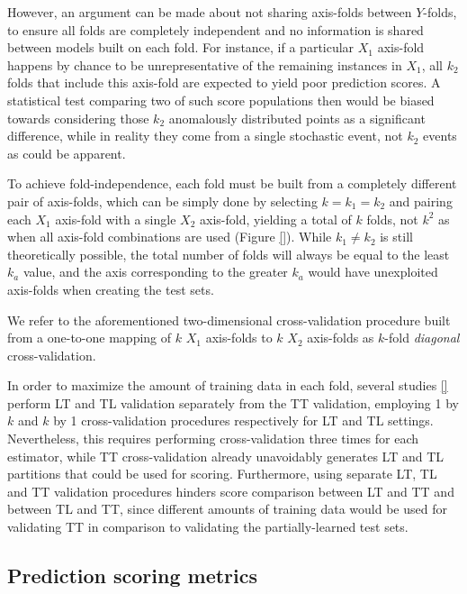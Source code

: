 However, an argument can be made about not sharing axis-folds between $Y$-folds, to ensure all folds are completely independent and no information is shared between models built on each fold. For instance, if a particular $X_1$ axis-fold happens by chance to be unrepresentative of the remaining instances in $X_1$, all $k_2$ folds that include this axis-fold are expected to yield poor prediction scores. A statistical test comparing two of such score populations then would be biased towards considering those $k_2$ anomalously distributed points as a significant difference, while in reality they come from a single stochastic event, not $k_2$ events as could be apparent.

To achieve fold-independence, each fold must be built from a completely different pair of axis-folds, which can be simply done by selecting $k=k_1=k_2$ and pairing each $X_1$ axis-fold with a single $X_2$ axis-fold, yielding a total of $k$ folds, not $k^2$ as when all axis-fold combinations are used (Figure \ref{}). While $k_1\neq k_2$ is still theoretically possible, the total number of folds will always be equal to the least $k_a$ value, and the axis corresponding to the greater $k_a$ would have unexploited axis-folds when creating the test sets.

We refer to the aforementioned two-dimensional cross-validation procedure built from a one-to-one mapping of $k$ $X_1$ axis-folds to $k$ $X_2$ axis-folds as $k$-fold \emph{diagonal} cross-validation.


In order to maximize the amount of training data in each fold, several studies \ref{} perform LT and TL validation separately from the TT validation, employing 1 by $k$ and $k$ by 1 cross-validation procedures respectively for LT and TL settings. Nevertheless, this requires performing cross-validation three times for each estimator, while TT cross-validation already unavoidably generates LT and TL partitions that could be used for scoring. Furthermore, using separate LT, TL and TT validation procedures hinders score comparison between LT and TT and between TL and TT, since different amounts of training data would be used for validating TT in comparison to validating the partially-learned test sets.



\subsection{Prediction scoring metrics}
\label{sec:prediction_metrics}

